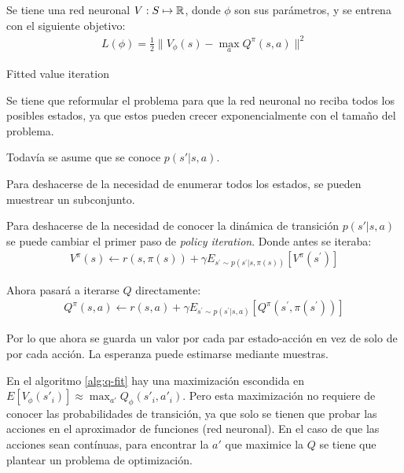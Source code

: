 Se tiene una red neuronal $V:S\mapsto \mathbb{R}$, donde  $\phi$ son sus parámetros, y se entrena con
el siguiente objetivo:
 \begin{align}
L ( \phi ) = \frac { 1 } { 2 } \| V _ { \phi } ( s ) - \operatorname { max } _ { a } Q ^ { \pi } ( s , a ) \| ^ { 2 }
\end{align}

\begin{algorithm}
    \caption{Fitted value iteration}
    \label{alg:q-fit}
\end{algorithm}

Se tiene que reformular el problema para que la red neuronal no reciba todos los posibles
estados, ya que estos pueden crecer exponencialmente con el tamaño del problema.

Todavía se asume que se conoce $p(s'|s,a)$.

Para deshacerse de la necesidad de enumerar todos los estados, se pueden muestrear
un subconjunto.

Para deshacerse de la necesidad de conocer la dinámica de transición $p(s'|s,a)$ se
puede cambiar el primer paso de \textit{policy iteration}. Donde antes se iteraba:
\begin{align}
V ^ { \pi } ( s ) \leftarrow r ( s , \pi ( s ) ) + \gamma E _ { s ^ { \prime } \sim p ( s ^ { \prime } | s , \pi ( s ) ) } [ V ^ { \pi } ( s ^ { \prime } ) ]
\end{align}

Ahora pasará a iterarse $Q$ directamente:
\begin{align}
Q ^ { \pi } ( s , a ) \leftarrow r ( s , a ) + \gamma E _ { s ^ { \prime } \sim p ( s ^ { \prime } | s , a ) } [ Q ^ { \pi } ( s ^ { \prime } , \pi ( s ^ { \prime } ) ) ]
\end{align}

Por lo que ahora se guarda un valor por cada par estado-acción en vez de solo de por cada
acción. La esperanza puede estimarse mediante muestras.

En el algoritmo \ref{alg:q-fit} hay una maximización escondida en $E[V_\phi(s'_i)] \approx
\max_{a'}Q_\phi(s'_i,a'_i)$. Pero esta maximización no requiere de conocer las probabilidades de
transición, ya que solo se tienen que probar las acciones en el aproximador de funciones (red
neuronal). En el caso de que las acciones sean contínuas, para encontrar la $a'$ que maximice
la  $Q$ se tiene que plantear un problema de optimización.

